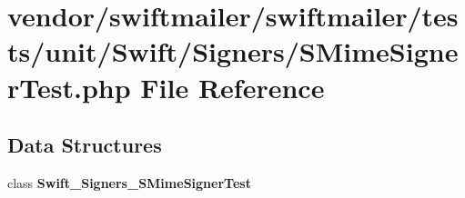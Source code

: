 \section{vendor/swiftmailer/swiftmailer/tests/unit/\+Swift/\+Signers/\+S\+Mime\+Signer\+Test.php File Reference}
\label{_s_mime_signer_test_8php}
\subsection*{Data Structures}
\begin{DoxyCompactItemize}
\item 
class {\bf Swift\+\_\+\+Signers\+\_\+\+S\+Mime\+Signer\+Test}
\end{DoxyCompactItemize}
